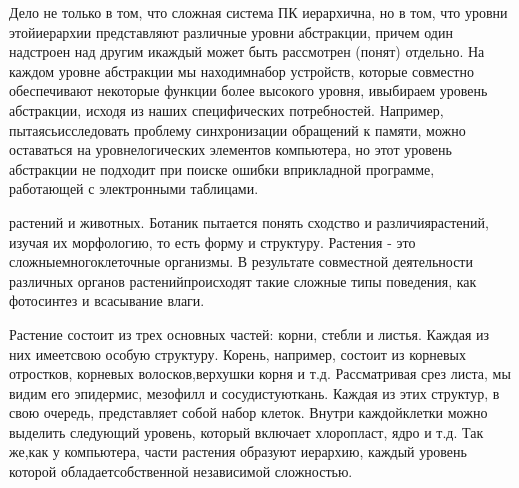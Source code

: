 \documentclass[10pt]{article}
\begin{document}
Дело не только в том, что сложная система ПК иерархична, но в том, что уровни этой\linebreak иерархии представляют различные уровни абстракции, причем один надстроен над другим и\linebreak каждый может быть рассмотрен (понят) отдельно. На каждом уровне абстракции мы находим\linebreak набор устройств, которые совместно обеспечивают некоторые функции более высокого уровня, и\linebreak выбираем уровень абстракции, исходя из наших специфических потребностей. Например, пытаясь\linebreak исследовать проблему синхронизации обращений к памяти, можно оставаться на уровне\linebreak логических элементов компьютера, но этот уровень абстракции не подходит при поиске ошибки в\linebreak прикладной программе, работающей с электронными таблицами. \vspace{3mm}

{ растений и животных.} Ботаник пытается понять сходство и различия\linebreak растений, изучая их морфологию, то есть форму и структуру. Растения - это сложные\linebreak многоклеточные организмы. В результате совместной деятельности различных органов растений\linebreak происходят такие сложные типы поведения, как фотосинтез и всасывание влаги. \vspace{3mm}

Растение состоит из трех основных частей: корни, стебли и листья. Каждая из них имеет\linebreak свою особую структуру. Корень, например, состоит из корневых отростков, корневых волосков,\linebreak верхушки корня и т.д. Рассматривая срез листа, мы видим его эпидермис, мезофилл и сосудистую\linebreak ткань. Каждая из этих структур, в свою очередь, представляет собой набор клеток. Внутри каждой\linebreak клетки можно выделить следующий уровень, который включает хлоропласт, ядро и т.д. Так же,\linebreak как у компьютера, части растения образуют иерархию, каждый уровень которой обладает\linebreak собственной независимой сложностью. \vspace{3mm}
\end{document}
